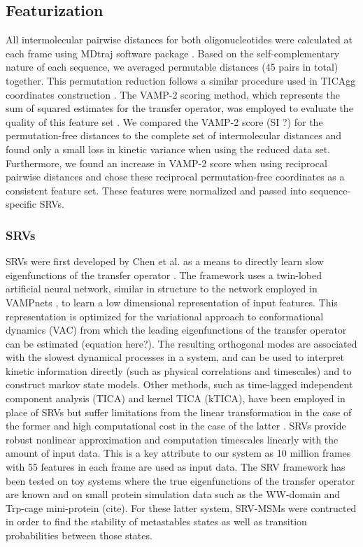 \documentclass[journal=jpcbfk,manuscript=article]{achemso}
\begin{document}
\subsection{\label{sec:methods}Featurization}

All intermolecular pairwise distances for both oligonucleotides were calculated at each frame using MDtraj software package \citep{McGibbon2015MDTraj:Trajectories}. Based on the self-complementary nature of each sequence, we averaged permutable distances (45 pairs in total) together. This permutation reduction follows a similar procedure used in TICAgg coordinates construction \citep{Sengupta2019AutomatedSelf-assembly}. The VAMP-2 scoring method, which represents the sum of squared estimates for the transfer operator, was employed to evaluate the quality of this feature set \citep{Mardt2018VAMPnetsKinetics}. We compared the VAMP-2 score (SI ?) for the permutation-free distances to the complete set of intermolecular distances and found only a small loss in kinetic variance when using the reduced data set. Furthermore, we found an increase in VAMP-2 score when using reciprocal pairwise distances and chose these reciprocal permutation-free coordinates as a consistent feature set. These features were normalized and passed into sequence-specific SRVs. 

\subsubsection{\label{sec:methods}SRVs}

SRVs were first developed by Chen et al. as a means to directly learn slow eigenfunctions of the transfer operator \citep{Chen}. The framework uses a twin-lobed artificial neural network, similar in structure to the network employed in VAMPnets \citep{Mardt2018VAMPnetsKinetics}, to learn a low dimensional representation of input features. This representation is optimized for the variational approach to conformational dynamics (VAC) from which the leading eigenfunctions of the transfer operator can be estimated (equation here?). The resulting orthogonal modes are associated with the slowest dynamical processes in a system, and can be used to interpret kinetic information directly (such as physical correlations and timescales) and to construct markov state models. Other methods, such as time-lagged independent component analysis (TICA) and kernel TICA (kTICA), have been employed in place of SRVs but suffer limitations from the linear transformation in the case of the former and high computational cost in the case of the latter \citep{Harrigan2017LandmarkDynamics}. SRVs provide robust nonlinear approximation and computation timescales linearly with the amount of input data. This is a key attribute to our system as 10 million frames with 55 features in each frame are used as input data. The SRV framework has been tested on toy systems where the true eigenfunctions of the transfer operator are known and on small protein simulation data such as the WW-domain and Trp-cage mini-protein (cite). For these latter system, SRV-MSMs were contructed in order to find the stability of metastables states as well as transition probabilities between those states.
\end{document}
